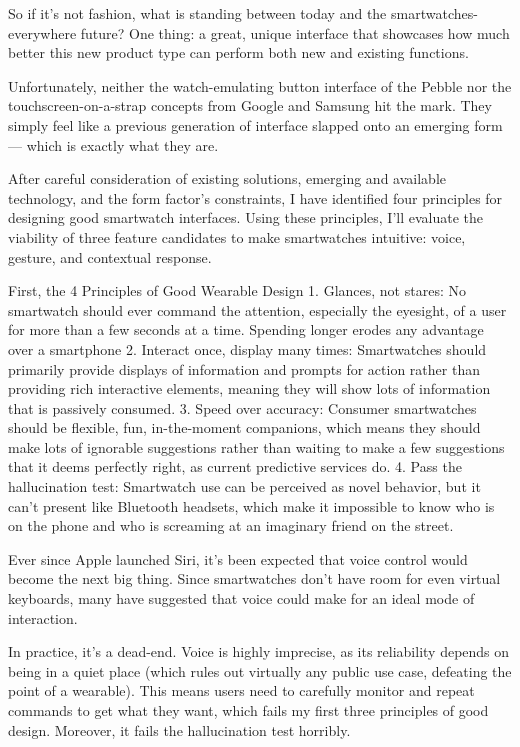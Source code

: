 \documentclass{article}
\begin{document}
So if it’s not fashion, what is standing between today and the smartwatches-everywhere future? One thing: a great, unique interface that showcases how much better this new product type can perform both new and existing functions.

Unfortunately, neither the watch-emulating button interface of the Pebble nor the touchscreen-on-a-strap concepts from Google and Samsung hit the mark. They simply feel like a previous generation of interface slapped onto an emerging form — which is exactly what they are.

After careful consideration of existing solutions, emerging and available technology, and the form factor’s constraints, I have identified four principles for designing good smartwatch interfaces. Using these principles, I’ll evaluate the viability of three feature candidates to make smartwatches intuitive: voice, gesture, and contextual response.

First, the 4 Principles of Good Wearable Design
1. Glances, not stares: No smartwatch should ever command the attention, especially the eyesight, of a user for more than a few seconds at a time. Spending longer erodes any advantage over a smartphone
2. Interact once, display many times: Smartwatches should primarily provide displays of information and prompts for action rather than providing rich interactive elements, meaning they will show lots of information that is passively consumed.
3. Speed over accuracy: Consumer smartwatches should be flexible, fun, in-the-moment companions, which means they should make lots of ignorable suggestions rather than waiting to make a few suggestions that it deems perfectly right, as current predictive services do.
4. Pass the hallucination test: Smartwatch use can be perceived as novel behavior, but it can’t present like Bluetooth headsets, which make it impossible to know who is on the phone and who is screaming at an imaginary friend on the street.

Ever since Apple launched Siri, it’s been expected that voice control would become the next big thing. Since smartwatches don’t have room for even virtual keyboards, many have suggested that voice could make for an ideal mode of interaction.

In practice, it’s a dead-end. Voice is highly imprecise, as its reliability depends on being in a quiet place (which rules out virtually any public use case, defeating the point of a wearable). This means users need to carefully monitor and repeat commands to get what they want, which fails my first three principles of good design. Moreover, it fails the hallucination test horribly.
\end{document}
